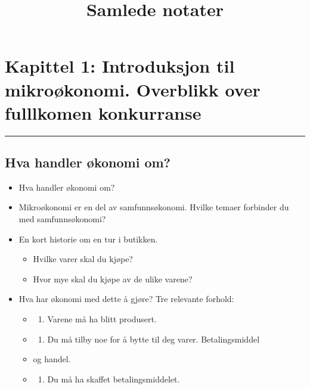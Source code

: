 \documentclass[
  letterpaper,
  DIV=11,
  numbers=noendperiod]{scrartcl}
\title{Samlede notater}
\author{}
\date{}
\providecommand{\tightlist}{%
  \setlength{\itemsep}{0pt}\setlength{\parskip}{0pt}}\usepackage{longtable,booktabs,array}
\renewcommand*\contentsname{Table of contents}
\newcommand\contentsname{Table of contents}
\begin{document}
\maketitle

\renewcommand*\contentsname{Table of contents}
{
\hypersetup{linkcolor=}
\setcounter{tocdepth}{3}
\tableofcontents
}
\listoffigures
\listoftables
\section{Kapittel 1: Introduksjon til mikroøkonomi. Overblikk over
fulllkomen
konkurranse}\label{kapittel-1-introduksjon-til-mikrouxf8konomi.-overblikk-over-fulllkomen-konkurranse}

\begin{center}\rule{0.5\linewidth}{0.5pt}\end{center}

\subsection{Hva handler økonomi om?}\label{hva-handler-uxf8konomi-om}

\begin{itemize}
\tightlist
\item
  Hva handler økonomi om?
\item
  Mikroøkonomi er en del av samfunnsøkonomi. Hvilke temaer forbinder du
  med samfunnsøkonomi?
\item
  En kort historie om en tur i butikken.

  \begin{itemize}
  \tightlist
  \item
    Hvilke varer skal du kjøpe?
  \item
    Hvor mye skal du kjøpe av de ulike varene?
  \end{itemize}
\item
  Hva har økonomi med dette å gjøre? Tre relevante forhold:

  \begin{itemize}
  \tightlist
  \item
    \begin{enumerate}
    \def\labelenumi{(\roman{enumi})}
    \tightlist
    \item
      Varene må ha blitt produsert.
    \end{enumerate}
  \item
    \begin{enumerate}
    \def\labelenumi{(\roman{enumi})}
    \setcounter{enumi}{1}
    \tightlist
    \item
      Du må tilby noe for å bytte til deg varer. Betalingsmiddel
    \end{enumerate}
  \item
    og handel.
  \item
    \begin{enumerate}
    \def\labelenumi{(\roman{enumi})}
    \setcounter{enumi}{2}
    \tightlist
    \item
      Du må ha skaffet betalingsmiddelet.
    \end{enumerate}
  \end{itemize}
\end{itemize}
\end{document}
